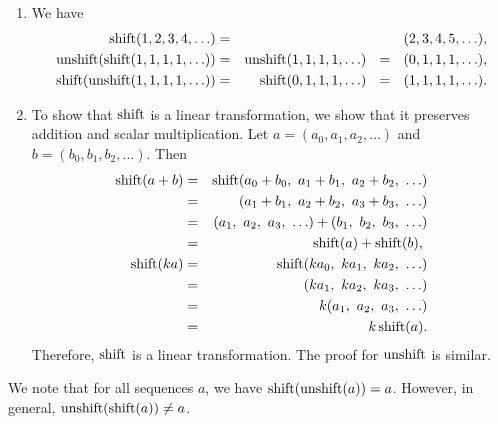 \begin{solution}
  \begin{enumialphparenastyle}
    \begin{enumerate}
    \item We have
      \begin{eqnarray*}
        \shift(1,2,3,4,\ldots)
        &=& (2,3,4,5,\ldots), \\
        \unshift(\shift(1,1,1,1,\ldots))
        &=& \unshift(1,1,1,1,\ldots)
        ~~=~~ (0,1,1,1,\ldots), \\
        \shift(\unshift(1,1,1,1,\ldots))
        &=& \shift(0,1,1,1,\ldots)
        ~~=~~ (1,1,1,1,\ldots).            
      \end{eqnarray*}
    \item To show that $\shift$ is a linear transformation, we show
      that it preserves addition and scalar multiplication. Let
      $a=(a_0,a_1,a_2,\ldots)$ and $b=(b_0,b_1,b_2,\ldots)$. Then
      \begin{eqnarray*}
        \shift(a+b) &=& \shift(a_0+b_0,~a_1+b_1,~a_2+b_2,~\ldots) \\
                    &=& (a_1+b_1,~a_2+b_2,~a_3+b_3,~\ldots) \\
                    &=& (a_1,~a_2,~a_3,~\ldots) + (b_1,~b_2,~b_3,~\ldots) \\
                    &=& \shift(a) + \shift(b),~ \\
        \shift(ka)  &=& \shift(ka_0,~ka_1,~ka_2,~\ldots) \\
                    &=& (ka_1,~ka_2,~ka_3,~\ldots) \\
                    &=& k(a_1,~a_2,~a_3,~\ldots) \\
                    &=& k\shift(a). \\
      \end{eqnarray*}
      Therefore, $\shift$ is a linear transformation. The proof for
      $\unshift$ is similar.
    \end{enumerate}
  \end{enumialphparenastyle}
\end{solution}

We note that for all sequences $a$, we have
$\shift(\unshift(a))=a$. However, in general,
$\unshift(\shift(a))\neq a$.
